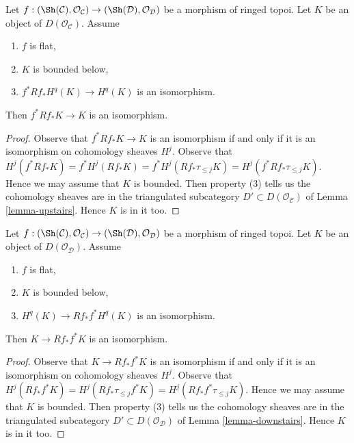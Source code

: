 \begin{lemma}
\label{lemma-bounded-in-image-upstairs}
Let $f : (\Sh(\mathcal{C}), \mathcal{O}_\mathcal{C}) \to
(\Sh(\mathcal{D}), \mathcal{O}_\mathcal{D})$ be a morphism of ringed topoi.
Let $K$ be an object of $D(\mathcal{O}_\mathcal{C})$. Assume
\begin{enumerate}
\item $f$ is flat,
\item $K$ is bounded below,
\item $f^*Rf_*H^q(K) \to H^q(K)$ is an isomorphism.
\end{enumerate}
Then $f^*Rf_*K \to K$ is an isomorphism.
\end{lemma}

\begin{proof}
Observe that $f^*Rf_*K \to K$ is an isomorphism if and only
if it is an isomorphism on cohomology sheaves $H^j$. Observe that
$H^j(f^*Rf_*K) = f^*H^j(Rf_*K) = f^*H^j(Rf_*\tau_{\leq j}K) =
H^j(f^*Rf_*\tau_{\leq j}K)$.
Hence we may assume that $K$ is bounded. Then property (3)
tells us the cohomology sheaves are in the triangulated
subcategory $D' \subset D(\mathcal{O}_\mathcal{C})$ of
Lemma \ref{lemma-upstairs}. Hence $K$ is in it too.
\end{proof}

\begin{lemma}
\label{lemma-bounded-in-image-downstairs}
Let $f : (\Sh(\mathcal{C}), \mathcal{O}_\mathcal{C}) \to
(\Sh(\mathcal{D}), \mathcal{O}_\mathcal{D})$ be a morphism of ringed topoi.
Let $K$ be an object of $D(\mathcal{O}_\mathcal{D})$. Assume
\begin{enumerate}
\item $f$ is flat,
\item $K$ is bounded below,
\item $H^q(K) \to Rf_*f^*H^q(K)$ is an isomorphism.
\end{enumerate}
Then $K \to Rf_*f^*K$ is an isomorphism.
\end{lemma}

\begin{proof}
Observe that $K \to Rf_*f^*K$ is an isomorphism if and only
if it is an isomorphism on cohomology sheaves $H^j$. Observe that
$H^j(Rf_*f^*K) = H^j(Rf_*\tau_{\leq j}f^*K) = H^j(Rf_*f^*\tau_{\leq j}K)$.
Hence we may assume that $K$ is bounded. Then property (3)
tells us the cohomology sheaves are in the triangulated
subcategory $D' \subset D(\mathcal{O}_\mathcal{D})$ of
Lemma \ref{lemma-downstairs}. Hence $K$ is in it too.
\end{proof}

